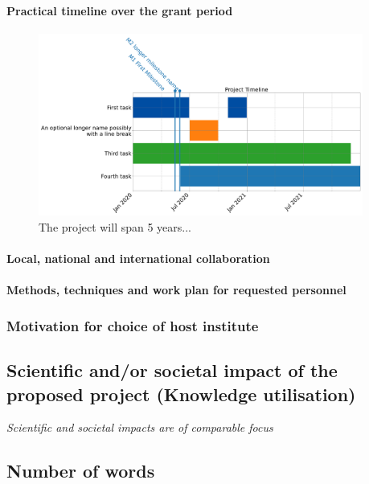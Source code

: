 \documentclass[10pt]{article}
\begin{document}
\begin{NoHyper}
	\paragraph{Practical timeline over the grant period\\}
	\begin{figure}[h!]
            \centering
        \includegraphics[width=0.95\textwidth]{figures/vidiGannt}
                \caption{The project will span 5 years...}
         \label{fig:gannt}
        \end{figure}
	\paragraph{Local, national and international collaboration\\}
	\paragraph{Methods, techniques and work plan for requested personnel\\}

	\subsubsection{Motivation for choice of host institute}

    \subsection{Scientific and/or societal impact of the proposed project (Knowledge utilisation)}
	    \textit{Scientific and societal impacts are of comparable focus}\\

		
	\subsection{Number of words}
	

\end{NoHyper}
\end{document}
